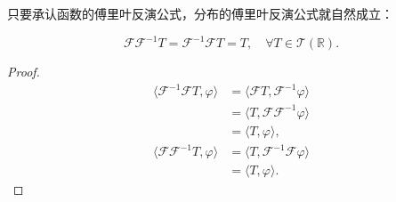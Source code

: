 只要承认函数的傅里叶反演公式，分布的傅里叶反演公式就自然成立：
\begin{theorem}[分布的傅里叶反演公式]
    \begin{equation}
        \mathcal{F}\mathcal{F}^{-1}T=\mathcal{F}^{-1}\mathcal{F}T=T,\quad \forall T\in\mathcal{T}(\mathbb{R}).
    \end{equation}
\end{theorem}
\begin{proof}
    \begin{align}
        \langle \mathcal{F}^{-1}\mathcal{F}T,\varphi\rangle & =\langle \mathcal{F}T,\mathcal{F}^{-1}\varphi\rangle\nonumber \\
                                                            & =\langle T,\mathcal{F}\mathcal{F}^{-1}\varphi\rangle\nonumber \\
                                                            & =\langle T,\varphi\rangle,                                      \\
        \langle \mathcal{F}\mathcal{F}^{-1}T,\varphi\rangle & =\langle T,\mathcal{F}^{-1}\mathcal{F}\varphi\rangle\nonumber \\
                                                            & =\langle T,\varphi\rangle.
    \end{align}
\end{proof}

